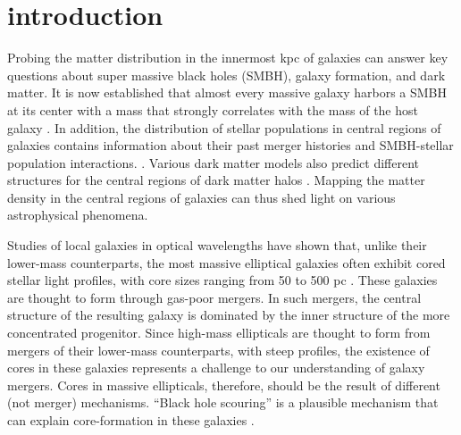 \documentclass[chicago]{emulateapj}
\begin{document}
\section{introduction}
Probing the matter distribution in the innermost kpc of galaxies can answer key questions about super massive black holes (SMBH), galaxy formation, and dark matter. It is now established that almost every massive galaxy harbors a SMBH at its center with a mass that strongly correlates with the mass of the host galaxy \citep{Kormendy:95,Ferrarese:00,Gebhardt:00,Tremaine:02}.
In addition, the distribution of stellar populations in central regions of galaxies contains information about their past merger histories and SMBH-stellar population interactions. \citep[e.g][]{Barnes:92,Ebisuzaki:91}.  Various dark matter models also predict different structures for the central regions of dark matter halos \citep[e.g][]{Rocha:13}.  Mapping the matter density in the central regions of galaxies can thus shed light on various astrophysical phenomena.

Studies of local galaxies in optical wavelengths have shown that, unlike their lower-mass counterparts, the most massive elliptical galaxies often exhibit cored stellar light profiles, with core sizes ranging from 50 to 500 pc \citep[e.g.,][]{Ferrarese:06}. 
These galaxies are thought to form through gas-poor mergers. In such mergers, the central structure of the resulting galaxy is dominated by the inner structure of the more concentrated progenitor.  Since high-mass ellipticals are thought to form from mergers of their lower-mass counterparts, with steep profiles, the existence of cores in these galaxies represents a challenge to our understanding of galaxy mergers. Cores in massive ellipticals, therefore, should be the result of different (not merger) mechanisms.  
``Black hole scouring'' is a plausible mechanism that can explain core-formation in these galaxies \citep{Thomas:14}.
\end{document}
